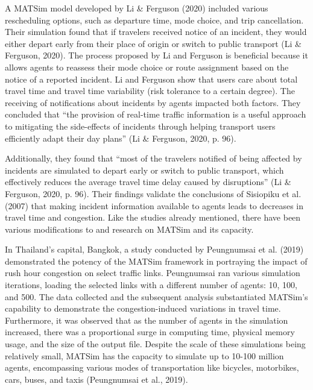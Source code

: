 \documentclass[fancy, oneside, mastersfancy, ms]{byuthesis}
\begin{document}
A MATSim model developed by Li \& Ferguson (2020) included various
rescheduling options, such as departure time, mode choice, and trip
cancellation. Their simulation found that if travelers received notice
of an incident, they would either depart early from their place of
origin or switch to public transport (Li \& Ferguson, 2020). The process
proposed by Li and Ferguson is beneficial because it allows agents to
reassess their mode choice or route assignment based on the notice of a
reported incident. Li and Ferguson show that users care about total
travel time and travel time variability (risk tolerance to a certain
degree). The receiving of notifications about incidents by agents
impacted both factors. They concluded that ``the provision of real-time
traffic information is a useful approach to mitigating the side-effects
of incidents through helping transport users efficiently adapt their day
plans'' (Li \& Ferguson, 2020, p. 96).

Additionally, they found that ``most of the travelers notified of being
affected by incidents are simulated to depart early or switch to public
transport, which effectively reduces the average travel time delay
caused by disruptions'' (Li \& Ferguson, 2020, p. 96). Their findings
validate the conclusions of Sisiopiku et al. (2007) that making incident
information available to agents leads to decreases in travel time and
congestion. Like the studies already mentioned, there have been various
modifications to and research on MATSim and its capacity.

In Thailand's capital, Bangkok, a study conducted by Peungnumsai et al.
(2019) demonstrated the potency of the MATSim framework in portraying
the impact of rush hour congestion on select traffic links. Peungnumsai
ran various simulation iterations, loading the selected links with a
different number of agents: 10, 100, and 500. The data collected and the
subsequent analysis substantiated MATSim's capability to demonstrate the
congestion-induced variations in travel time. Furthermore, it was
observed that as the number of agents in the simulation increased, there
was a proportional surge in computing time, physical memory usage, and
the size of the output file. Despite the scale of these simulations
being relatively small, MATSim has the capacity to simulate up to 10-100
million agents, encompassing various modes of transportation like
bicycles, motorbikes, cars, buses, and taxis (Peungnumsai et al., 2019).
\end{document}
